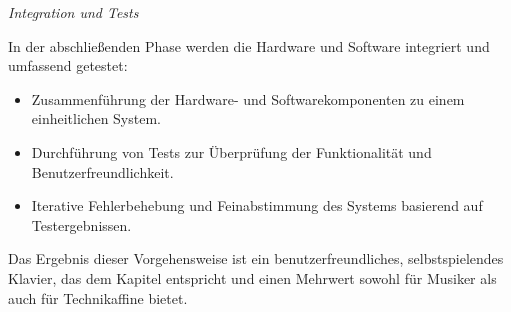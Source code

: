 \textit{Integration und Tests}

In der abschließenden Phase werden die Hardware und Software integriert und umfassend getestet:

\begin{itemize}
    \item Zusammenführung der Hardware- und Softwarekomponenten zu einem einheitlichen System.
    \item Durchführung von Tests zur Überprüfung der Funktionalität und Benutzerfreundlichkeit.
    \item Iterative Fehlerbehebung und Feinabstimmung des Systems basierend auf Testergebnissen.
\end{itemize}

Das Ergebnis dieser Vorgehensweise ist ein benutzerfreundliches, selbstspielendes Klavier,
das dem Kapitel  entspricht und einen Mehrwert sowohl für Musiker als auch für Technikaffine bietet.
